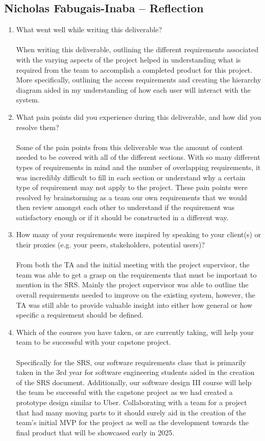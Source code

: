 \documentclass[12pt]{article}
\begin{document}
\subsection*{Nicholas Fabugais-Inaba -- Reflection}

\begin{enumerate}
  \item What went well while writing this deliverable?\\\\
  When writing this deliverable, outlining the different requirements associated
  with the varying aspects of the project helped in understanding what is required
  from the team to accomplish a completed product for this project. More specifically,
  outlining the access requirements and creating the hierarchy diagram aided in
  my understanding of how each user will interact with the system.
  \item What pain points did you experience during this deliverable, and how
  did you resolve them?\\\\
  Some of the pain points from this deliverable was the amount of content 
  needed to be covered with all of the different sections. With so many different
  types of requirements in mind and the number of overlapping requirements, it
  was incredibly difficult to fill in each section or understand why a certain
  type of requirement may not apply to the project. These pain points were resolved
  by brainstorming as a team our own requirements that we would then review
  amongst each other to understand if the requirement was satisfactory enough
  or if it should be constructed in a different way.
  \item How many of your requirements were inspired by speaking to your
  client(s) or their proxies (e.g. your peers, stakeholders, potential users)?
  \\\\
  From both the TA and the initial meeting with the project supervisor, the team
  was able to get a grasp on the requirements that must be important to mention
  in the SRS. Mainly the project supervisor was able to outline the overall
  requirements needed to improve on the existing system, however, the TA was 
  still able to provide valuable insight into either how general or how specific
  a requirement should be defined.
  \item Which of the courses you have taken, or are currently taking, will help
  your team to be successful with your capstone project.\\\\
  Specifically for the SRS, our software requirements class that is primarily taken
  in the 3rd year for software engineering students aided in the creation
  of the SRS document. Additionally, our software design III course will help the
  team be successful with the capstone project as we had created a prototype design
  similar to Uber. Collaborating with a team for a project that had many moving
  parts to it should surely aid in the creation of the team's initial MVP for
  the project as well as the development towards the final product that will
  be showcased early in 2025.


\end{enumerate}
\end{document}
